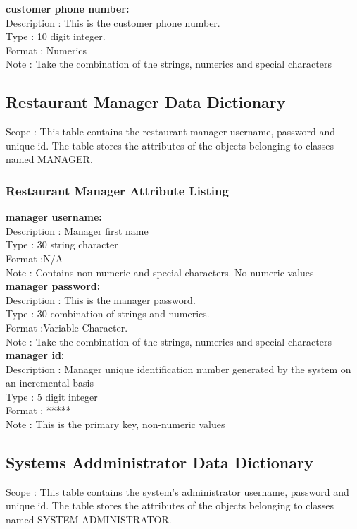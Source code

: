 \documentclass[12pt]{article}
\begin{document}
\textbf {customer phone number:}\\
Description : This is the customer phone number.\\
Type :  10 digit integer. \\
Format : Numerics\\
Note : Take the combination of the strings, numerics and special characters

\subsection{Restaurant Manager Data Dictionary} 
Scope : This table contains the restaurant manager username, password and unique id. The table stores the attributes of the objects belonging to classes named MANAGER.
\\

\subsubsection{Restaurant Manager Attribute Listing}

\textbf {manager username:}\\
Description : Manager first name\\
Type : 30 string character \\
Format :N/A \\
Note : Contains non-numeric and special characters. No numeric values\\

\textbf {manager password:}\\
Description : This is the manager password.\\
Type : 30 combination of strings and numerics. \\
Format :Variable Character. \\
Note : Take the combination of the strings, numerics and special characters\\

\textbf {manager id:}\\
Description : Manager unique identification number generated by the system on an incremental basis\\
Type : 5 digit integer \\
Format : ***** \\
Note : This is the primary key, non-numeric values

\subsection{Systems Addministrator Data Dictionary} 
Scope : This table contains the system's administrator username, password and unique id. The table stores the attributes of the objects belonging to classes named SYSTEM ADMINISTRATOR.
\end{document}
